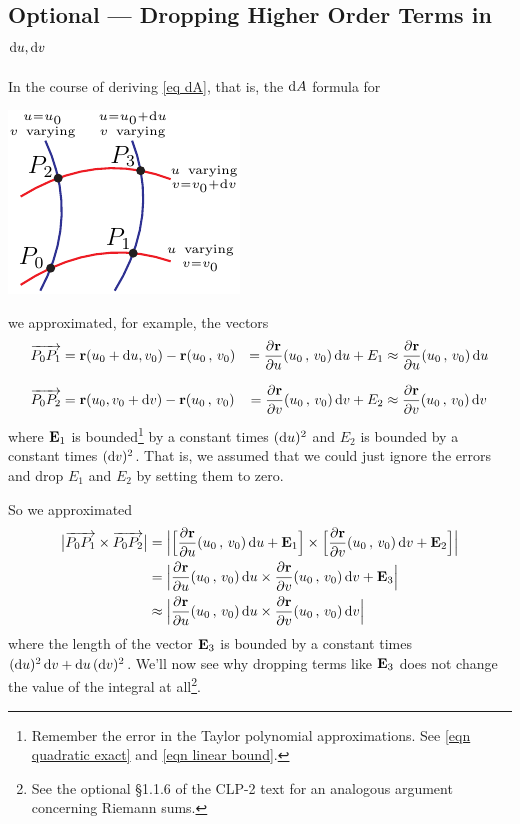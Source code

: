 \subsection{Optional --- Dropping Higher Order Terms in $\mathrm{d}u,\mathrm{d}v$}\label{sec:hoterms}
In the course of deriving \eqref{eq dA}, that is,
the $\mathrm{d}A$ formula for 
\begin{nfig}
\begin{center}
    \includegraphics{dA.pdf}
\end{center}
\end{nfig}
we approximated, for example, the vectors
\begin{alignat*}{3}
\overrightarrow{P_0P_1}
&=\vr(u_0+\dee{u}, v_0) -\vr(u_0\,,\,v_0) 
&= \pdiff{\vr}{u}(u_0\,,\,v_0)\,\dee{u} + E_1
&\approx \pdiff{\vr}{u}(u_0\,,\,v_0)\,\dee{u}  \\[0.1in]
\overrightarrow{P_0P_2}
&=\vr(u_0, v_0+\dee{v})-\vr(u_0\,,\,v_0) 
&= \pdiff{\vr}{v}(u_0\,,\,v_0)\,\dee{v}  + E_2
&\approx \pdiff{\vr}{v}(u_0\,,\,v_0)\,\dee{v}  
\end{alignat*}
where $\mathbf{E}_1$ is bounded\footnote{Remember the error in the Taylor polynomial 
approximations. See \eqref{eqn quadratic exact} and
\eqref{eqn linear bound}.} by a constant times $(\mathrm{d}u)^2$
and $E_2$ is bounded by a constant times $(\mathrm{d}v)^2$. That is, we assumed 
that we could just ignore the errors and drop $E_1$ and $E_2$ by setting them
to zero. 

So we approximated
\begin{align*}
\big|\overrightarrow{P_0P_1}\times\overrightarrow{P_0P_2}\big|
&=\Big|\Big[\pdiff{\vr}{u}(u_0\,,\,v_0)\,\dee{u} + \vE_1\Big]
\times\Big[\pdiff{\vr}{v}(u_0\,,\,v_0)\,\dee{v} + \vE_2\Big]
\Big| \\
&=\Big|\pdiff{\vr}{u}(u_0\,,\,v_0)\,\dee{u} 
\times\pdiff{\vr}{v}(u_0\,,\,v_0)\,\dee{v} + \vE_3
\Big| \\
&\approx \Big|\pdiff{\vr}{u}(u_0\,,\,v_0)\,\dee{u} 
\times\pdiff{\vr}{v}(u_0\,,\,v_0)\,\dee{v}
\Big|
\end{align*}
where the length of the vector $\mathbf{E}_3$ is bounded by a constant times 
$(\mathrm{d}u)^2\,\mathrm{d}v+\mathrm{d}u\,(\mathrm{d}v)^2$.
We'll now see why dropping terms like $\mathbf{E}_3$ does not change the value
of the integral at all\footnote{See the optional \S 1.1.6 of the CLP-2 text
for an analogous argument concerning Riemann sums.}. 

